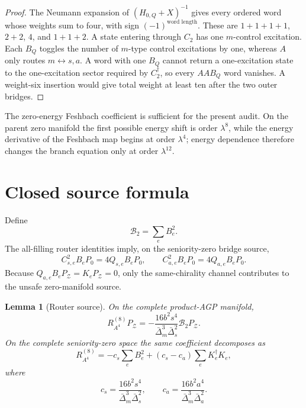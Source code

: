 \documentclass[11pt]{article}
\newtheorem{lemma}[theorem]{Lemma}
\theoremstyle{definition}
\theoremstyle{remark}
\newcommand{\cZ}{\mathcal Z}
\newcommand{\cB}{\mathcal B}
\begin{document}
\begin{proof}
The Neumann expansion of $(H_{0,Q}+X)^{-1}$ gives every ordered word whose weights sum to four, with sign $(-1)^{\text{word length}}$.  These are $1+1+1+1$, $2+2$, $4$, and $1+1+2$.  A state entering through $C_2$ has one $m$-control excitation.  Each $B_Q$ toggles the number of $m$-type control excitations by one, whereas $A$ only routes $m\leftrightarrow s,a$.  A word with one $B_Q$ cannot return a one-excitation state to the one-excitation sector required by $C_2^\dagger$, so every $AAB_Q$ word vanishes.  A weight-six insertion would give total weight at least ten after the two outer bridges.
\end{proof}

The zero-energy Feshbach coefficient is sufficient for the present audit.  On the parent zero manifold the first possible energy shift is order $\lambda^8$, while the energy derivative of the Feshbach map begins at order $\lambda^4$; energy dependence therefore changes the branch equation only at order $\lambda^{12}$.

\section{Closed source formula}

Define
\begin{equation}
 \cB_2=\sum_eB_e^2.
 \label{eq:B2sum}
\end{equation}
The all-filling router identities imply, on the seniority-zero bridge source,
\begin{equation}
 C_{s,e}^2B_eP_0=4Q_{s,e}B_eP_0,
 \qquad
 C_{a,e}^2B_eP_0=4Q_{a,e}B_eP_0.
 \label{eq:router}
\end{equation}
Because $Q_{a,e}B_eP_{\cZ}=K_eP_{\cZ}=0$, only the same-chirality channel contributes to the unsafe zero-manifold source.

\begin{lemma}[Router source]
\label{lem:router-source}
On the complete product-AGP manifold,
\begin{equation}
 R_{A^4}^{(8)}P_{\cZ}
 =-\frac{16b^2s^4}{\bar\Delta_m^3\bar\Delta_s^2}
 \cB_2P_{\cZ}.
 \label{eq:A4source}
\end{equation}
On the complete seniority-zero space the same coefficient decomposes as
\begin{equation}
 R_{A^4}^{(8)}
 =-c_s\sum_eB_e^2+(c_s-c_a)\sum_eK_e^\dagger K_e,
 \label{eq:A4decomp}
\end{equation}
where
\begin{equation}
 c_s=\frac{16b^2s^4}{\bar\Delta_m^3\bar\Delta_s^2},
 \qquad
 c_a=\frac{16b^2a^4}{\bar\Delta_m^3\bar\Delta_a^2}.
 \label{eq:csca}
\end{equation}
\end{lemma}
\end{document}
